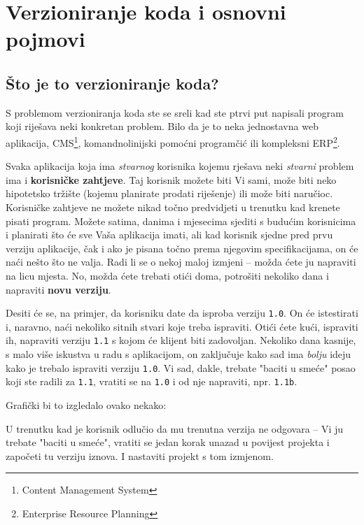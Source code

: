 \chapter*{Verzioniranje koda i osnovni pojmovi}

\section*{Što je to verzioniranje koda?}

S problemom verzioniranja koda ste se sreli kad ste ptrvi put napisali program koji riješava neki konkretan problem. 
Bilo da je to neka jednostavna web aplikacija, CMS\footnote{Content Management System}, komandnolinijski pomoćni programčić ili kompleksni ERP\footnote{Enterprise Resource Planning}.

Svaka aplikacija koja ima \textit{stvarnog} korisnika kojemu rješava neki \textit{stvarni} problem ima i \textbf{korisničke zahtjeve}.
Taj korisnik možete biti Vi sami, može biti neko hipotetsko tržište (kojemu planirate prodati riješenje) ili može biti naručioc.
Korisničke zahtjeve ne možete nikad točno predvidjeti u trenutku kad krenete pisati program.
Možete satima, danima i mjesecima sjediti s budućim korisnicima i planirati što će sve Vaša aplikacija imati, ali kad korisnik sjedne pred prvu verziju aplikacije, čak i ako je pisana točno prema njegovim specifikacijama, on će naći nešto što ne valja. 
Radi li se o nekoj maloj izmjeni -- možda ćete ju napraviti na licu mjesta. No, možda ćete trebati otići doma, potrošiti nekoliko dana i napraviti \textbf{novu verziju}.

Desiti će se, na primjer, da korisniku date da isproba verziju \texttt{1.0}.
On će istestirati i, naravno, naći nekoliko sitnih stvari koje treba ispraviti.
Otići ćete kući, ispraviti ih, napraviti verziju \texttt{1.1} s kojom će klijent biti zadovoljan.
Nekoliko dana kasnije, s malo više iskustva u radu s aplikacijom, on zaključuje kako sad ima \textit{bolju} ideju kako je trebalo ispraviti verziju \texttt{1.0}.
Vi sad, dakle, trebate "baciti u smeće" posao koji ste radili za \texttt{1.1}, vratiti se na \texttt{1.0} i od nje napraviti, npr. \texttt{1.1b}.

Grafički bi to izgledalo ovako nekako:



U trenutku kad je korisnik odlučio da mu trenutna verzija ne odgovara -- Vi ju trebate "baciti u smeće", vratiti se jedan korak unazad u povijest projekta i započeti tu verziju iznova. I nastaviti projekt s tom izmjenom.

